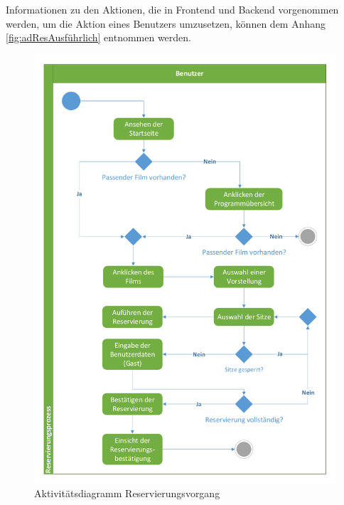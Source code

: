 		Informationen zu den Aktionen, die in Frontend und Backend vorgenommen werden, um die Aktion eines Benutzers umzusetzen, können dem Anhang \vref{fig:adResAusführlich} entnommen werden.
				
		\begin{figure}[H]
			\centering 
			\includegraphics[width=12cm]{img/adReservierung_min.pdf}
			\captionsetup{format=hang}
			\caption[Aktivitätsdiagramm Reservierung]{\label{fig:aktivitätReservierung} Aktivitätsdiagramm Reservierungsvorgang}
		\end{figure}
				
			